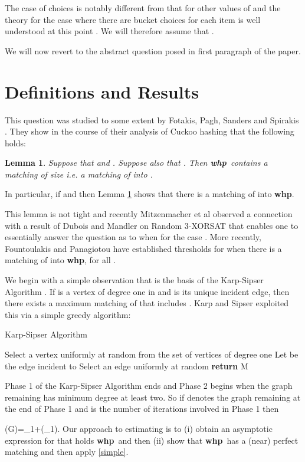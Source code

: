 \documentclass[11pt]{article}
\def\G{\Gamma}
\def\m{\mu}
\def\t{\tau}
\def\whp{{\bf whp}}
\newcommand{\proofend}{\hspace*{\fill}\mbox{}}
\newtheorem{lemma}[theorem]{Lemma}
\newcommand{\beq}[1]{}
\begin{document}
The case of  choices is notably different from that for other values
of  and the theory for the case where there are  
bucket choices for each item is well understood at this point
\cite{DM,kutz,cuckoo}. We will therefore assume that .

We will now revert to the abstract question posed in first paragraph of the paper.
\section{Definitions and Results}
This question was studied to some extent by Fotakis, Pagh, Sanders and Spirakis \cite{fotakis}.
They show in the course of their analysis of Cuckoo hashing that the following holds:
\begin{lemma}\label{fot}
Suppose that  and . Suppose also that . Then
\whp\  contains a matching of size  i.e. a matching of  into .
\end{lemma}
\proofend

In particular, if  and  then Lemma \ref{fot} shows that there is a matching of  into  \whp.

This lemma is not tight and recently  Mitzenmacher et al \cite{DMP} observed a connection with a result of
Dubois and Mandler on Random 3-XORSAT \cite{DuMa} that enables one to essentially answer the question as to when
 for the case . More recently, Fountoulakis and Panagiotou \cite{FP} have established 
thresholds for when there is a matching of  into  \whp, for all .

We begin with a simple observation that is the basis of the Karp-Sipser Algorithm
\cite{KS,AFP}. If  is a vertex of degree one in  and  is its unique incident edge,
then there exists a maximum matching of  that includes . Karp and Sipser exploited this via a simple 
greedy algorithm:
 \begin{algorithm}
\caption{Karp-Sipser Algorithm}\label{KS}
\begin{algorithmic}[1]
\State 
\While{}
    \State Select a vertex  uniformly at random from the set of vertices of degree one
    \State Let  be the edge incident to 
  \Else
    \State Select an edge  uniformly at random\label{phase2}
  \EndIf
  \State 
  \State  
\EndWhile
\State \textbf{return} M
\EndProcedure
\end{algorithmic}
\end{algorithm}

Phase 1 of the Karp-Sipser Algorithm ends and Phase 2 begins when the graph remaining has minimum degree at least two. 
So if  denotes the graph  remaining at the end of
Phase 1 and  is the number of iterations involved in Phase 1 then
\beq{simple}
\m(G)=\t_1+\m(\G_1).
\eeq
Our approach to estimating  is to (i) obtain an asymptotic expression for  that holds \whp\ and then (ii) show that 
\whp\  has a (near) perfect matching and then apply \eqref{simple}.
\end{document}
